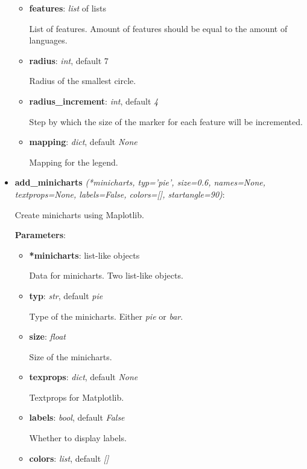 \documentclass[a4paper,12pt]{article}
\begin{document}
\begin{itemize}
 \begin{itemize}
 \item \textbf{features}: \textit{list} of lists
 
 List of features. Amount of features should be equal to the amount of languages.
 
 \item \textbf{radius}: \textit{int}, default 7
 
 Radius of the smallest circle.
 
 \item \textbf {radius\_increment}: \textit{int}, default \textit{4}
 
 Step by which the size of the marker for each feature will be incremented.
 
 \item \textbf {mapping}: \textit{dict}, default \textit{None}
 
 Mapping for the legend.
 
 \end{itemize}
 
 \item \textbf{add\_minicharts} \textit{(*minicharts, typ='pie', size=0.6, names=None, textprops=None, labels=False, colors=[], startangle=90)}:
 
 Create minicharts using Maplotlib.
 
 \textbf{Parameters}:
 
 \begin{itemize}
 \item \textbf{*minicharts}: list-like objects
 
 Data for minicharts. Two list-like objects.
 
 \item \textbf{typ}: \textit{str}, default \textit{pie}
 
 Type of the minicharts. Either \textit{pie} or \textit{bar}.
 
 \item \textbf{size}: \textit{float}
 
 Size of the minicharts.
 
 \item \textbf{texprops}: \textit{dict}, default \textit{None}
 
 Textprops for Matplotlib.
 
 \item \textbf{labels}: \textit{bool}, default \textit{False}
 
 Whether to display labels.
 
 \item \textbf{colors}: \textit{list}, default \textit{[]}
 

\end{itemize}
\end{itemize}
\end{document}
